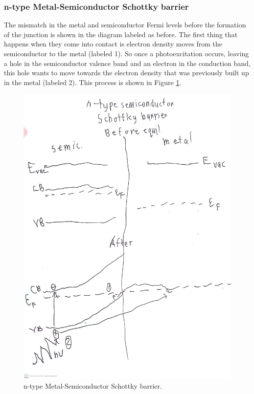 \documentclass[12pt]{article}
\begin{document}
\subsubsection{n-type Metal-Semiconductor Schottky barrier}
The mismatch in the metal and semiconductor Fermi levels before the formation of the junction is shown in the diagram labeled as before. The first thing that happens when they come into contact is electron density moves from the semiconductor to the metal (labeled 1). So once a photoexcitation occurs, leaving a hole in the semiconductor valence band and an electron in the conduction band, this hole wants to move towards the electron density that was previously built up in the metal (labeled 2). This process is shown in Figure \ref{fig:schottky}.
\begin{figure}[h]
\centering
\includegraphics[width=\textwidth]{schottky.jpg}
\caption{n-type Metal-Semiconductor Schottky barrier.}
\label{fig:schottky}
\end{figure}
\end{document}
